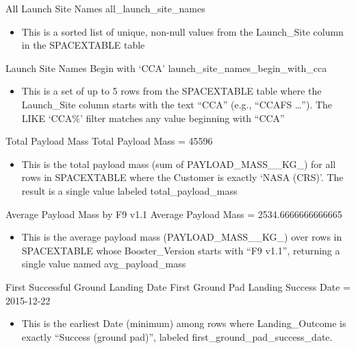 \begin{frame}{All Launch Site Names}
    {all_launch_site_names}
    \begin{itemize}
        \item This is a sorted list of unique, non-null values from the Launch\_Site column in the SPACEXTABLE table
    \end{itemize}
\end{frame}

\begin{frame}{Launch Site Names Begin with `CCA'}
    {launch_site_names_begin_with_cca}
    \begin{itemize}
        \item This is a set of up to 5 rows from the SPACEXTABLE table where the Launch\_Site column starts with the text ``CCA'' (e.g., ``CCAFS \dots''). The LIKE `CCA\%' filter matches any value beginning with ``CCA''
    \end{itemize}
\end{frame}

\begin{frame}{Total Payload Mass}
    Total Payload Mass = 45596
    \begin{itemize}
        \item This is the total payload mass (sum of PAYLOAD\_MASS\_\_KG\_) for all rows in SPACEXTABLE where the Customer is exactly `NASA (CRS)'. The result is a single value labeled total\_payload\_mass
    \end{itemize}
\end{frame}

\begin{frame}{Average Payload Mass by F9 v1.1}
    Average Payload Mass = 2534.6666666666665
    \begin{itemize}
        \item This is the average payload mass (PAYLOAD\_MASS\_\_KG\_) over rows in SPACEXTABLE whose Booster\_Version starts with ``F9 v1.1'', returning a single value named avg\_payload\_mass
    \end{itemize}
\end{frame}

\begin{frame}{First Successful Ground Landing Date}
    First Ground Pad Landing Success Date = 2015-12-22
    \begin{itemize}
        \item This is the earliest Date (minimum) among rows where Landing\_Outcome is exactly ``Success (ground pad)'', labeled first\_ground\_pad\_success\_date.
    \end{itemize}
\end{frame}

